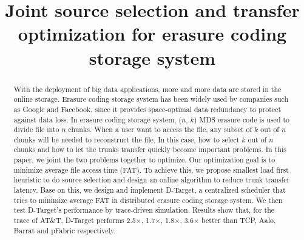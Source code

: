 \documentclass{IEEEtran}
\begin{document}
\title{Joint source selection and transfer optimization for erasure coding storage system}
\author{
}

\maketitle


\begin{abstract}
With the deployment of big data applications, more and more data are stored in the online storage.
Erasure coding storage system has been widely used by companies such as Google and Facebook, since it provides space-optimal data redundancy to protect against data loss. 
In erasure coding storage system, ($n$, $k$) MDS erasure code is used to divide file into $n$ chunks.
When a user want to access the file, any subset of $k$ out of $n$ chunks will be needed to reconstruct the file.
In this case, how to select $k$ out of $n$ chunks and how to let the trunks transfer quickly become important problems.
In this paper, we joint the two problems together to optimize.
Our optimization goal is to minimize average file access time (FAT).
To achieve this, we propose smallest load first heuristic to do source selection and design an online algorithm to reduce trunk transfer latency.
Base on this, we design and implement D-Target, a centralized scheduler that tries to minimize average FAT in distributed erasure coding storage system.
We then test D-Target's performance by trace-driven simulation.
Results show that, for the trace of AT$\&$T,  D-Target performs 2.5$\times$, 1.7$\times$, 1.8$\times$, 3.6$\times$ better than TCP, Aalo, Barrat and pFabric respectively.
\end{abstract}
\end{document}
